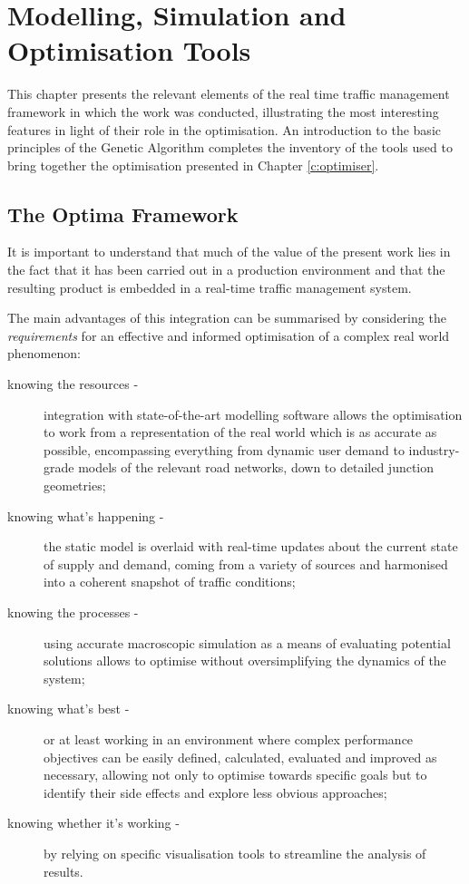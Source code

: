 \chapter{Modelling, Simulation and Optimisation Tools} \label{c:tools}
This chapter presents the relevant elements of the real time traffic management framework in which the work was conducted, illustrating the most interesting features in light of their role in the optimisation. An introduction to the basic principles of the Genetic Algorithm completes the inventory of the tools used to bring together the optimisation presented in Chapter \ref{c:optimiser}.


\section{The Optima Framework} \label{s:optima}
It is important to understand that much of the value of the present work lies in the fact that it has been carried out in a production environment and that the resulting product is embedded in a real-time traffic management system.

The main advantages of this integration can be summarised by considering the \emph{requirements} for an effective and informed optimisation of a complex real world phenomenon:
\begin{description}
\item[knowing the resources -] integration with state-of-the-art modelling software allows the optimisation to work from a representation of the real world which is as accurate as possible, encompassing everything from dynamic user demand to industry-grade models of the relevant road networks, down to detailed junction geometries;

\item[knowing what's happening -] the static model is overlaid with real-time updates about the current state of supply and demand, coming from a variety of sources and harmonised into a coherent snapshot of traffic conditions;

\item[knowing the processes -] using accurate macroscopic simulation as a means of evaluating potential solutions allows to optimise without oversimplifying the dynamics of the system;

\item[knowing what's best -] or at least working in an environment where complex performance objectives can be easily defined, calculated, evaluated and improved as necessary, allowing not only to optimise towards specific goals but to identify their side effects and explore less obvious approaches;

\item[knowing whether it's working -] by relying on specific visualisation tools to streamline the analysis of results.
\end{description}

